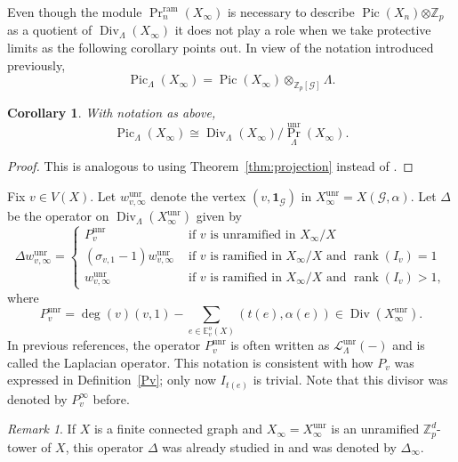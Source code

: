 \documentclass{amsart}
\newtheorem{corollary}[theorem]{Corollary}
\numberwithin{equation}{section}
\theoremstyle{remark}
\newtheorem{remark}[theorem]{Remark}
\newcommand{\Div}{\operatorname{Div}}
\newcommand{\Pic}{\operatorname{Pic}}
\newcommand{\unr}{\operatorname{unr}}
\newcommand{\ram}{\operatorname{ram}}
\newcommand{\rk}{\operatorname{rank}}
\newcommand{\Z}{\mathbb{Z}}
\newcommand{\E}{\mathbb{E}}
\newcommand{\cG}{\mathcal{G}}
\theoremstyle{plain} %
\begin{document}
Even though the module $\Pr_n^{\ram}(X_\infty)$ is necessary to describe $\Pic(X_n){\otimes \Z_p}$ as a quotient of $\Div_\Lambda(X_\infty)$ it does not play a role when we take protective limits as the following corollary points out.
{In view of the notation introduced previously,
\[
\Pic_\Lambda(X_\infty) = \Pic(X_\infty) \otimes_{\Z_p[\mathcal{G}]} {\Lambda}.
\]}

\begin{corollary}
\label{cor:ideals}
With notation as above,
\[
\Pic_\Lambda(X_\infty)\cong \Div_\Lambda(X_\infty)/{\Pr}^{\unr}_\Lambda(X_\infty).
\]
\end{corollary}

\begin{proof}
This is analogous to \cite[Corollary 5.5]{GV24} using Theorem~\ref{thm:projection} instead of \cite[Theorem 5.4]{GV24}.
\end{proof}

{Fix $v\in V(X)$.}
Let $w_{v,\infty}^{\unr}$ denote the vertex $(v, \mathbf{1}_{\cG})$ in $X_\infty^{\unr} = X(\cG,\alpha)$.
Let $\Delta$ be the operator on $\Div_\Lambda(X_\infty^{\unr})$ given by \[
\Delta w^{\unr}_{v,\infty}=
\begin{cases}
P_v^{\unr} &\textrm{ if } v \textrm{ is unramified in } X_\infty/X\\
(\sigma_{v,1}-1)w_{v,\infty}^{\unr} &\textrm{ if }
v \textrm{ is ramified in } X_\infty/X \textrm{ and } \rk(I_{v})=1\\
w_{v,\infty}^{\unr} &\textrm{ if }
v \textrm{ is ramified in } X_\infty/X \textrm{ and } \rk(I_{v})>1,
\end{cases}
\]
where 
\[
P^{\unr}_v =\deg(v)(v,1)-\sum_{e\in \E^o_{v}(X)}(t(e),\alpha(e))\in \Div(X^{\unr}_\infty).
\]
In previous references, the operator $P_v^{\unr}$ is often written as $\mathcal{L}_{\Lambda}^{\unr}(-)$ and is called the Laplacian operator.
This notation is consistent with how $P_v$ was expressed in Definition~\ref{Pv}; only now $I_{t(e)}$ is trivial.
{Note that this divisor was denoted by $P_v^{\infty}$ before.}

\begin{remark}
If $X$ is a finite connected graph and $X_\infty =X_\infty^{\unr}$ is an unramified $\Z_p^d$-tower of $X$, this operator $\Delta$ was already studied in \cite{Kleine-Mueller4} and was denoted by $\Delta_\infty$.
\end{remark}
 
\end{document}
